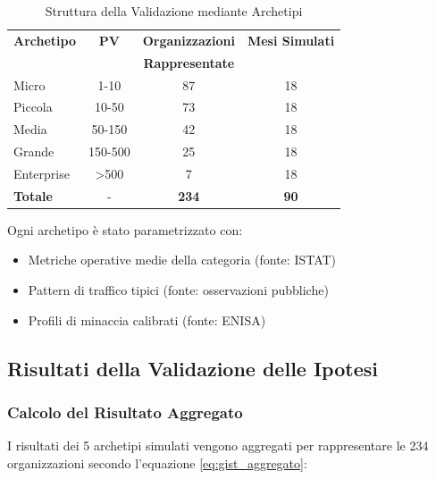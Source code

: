 \begin{table}[ht!]
\centering
\caption{Struttura della Validazione mediante Archetipi}
\small
\sffamily
\begin{tabularx}{\textwidth}{X c c c}
\toprule
\textbf{Archetipo} & \textbf{PV} & \textbf{Organizzazioni} & \textbf{Mesi Simulati} \\
                   &             & \textbf{Rappresentate} & \\
\midrule
Micro & 1-10 & 87 & 18 \\
Piccola & 10-50 & 73 & 18 \\
Media & 50-150 & 42 & 18 \\
Grande & 150-500 & 25 & 18 \\
Enterprise & >500 & 7 & 18 \\
\midrule
\textbf{Totale} & - & \textbf{234} & \textbf{90} \\
\bottomrule
\end{tabularx}
\end{table}

Ogni archetipo è stato parametrizzato con:
\begin{itemize}
\item Metriche operative medie della categoria (fonte: ISTAT)
\item Pattern di traffico tipici (fonte: osservazioni pubbliche)
\item Profili di minaccia calibrati (fonte: ENISA)
\end{itemize}

\subsection{\texorpdfstring{Risultati della Validazione delle Ipotesi}{5.2.2 - Risultati della Validazione delle Ipotesi}}
\label{subsec:5.2.2}

\subsubsection{\texorpdfstring{Calcolo del Risultato Aggregato}{5.2.1.1 - Calcolo del Risultato Aggregato}}

I risultati dei 5 archetipi simulati vengono aggregati per rappresentare le 234 organizzazioni secondo l'equazione \ref{eq:gist_aggregato}:

